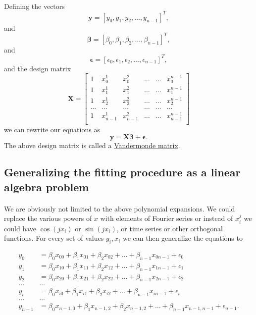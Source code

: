 \documentclass[%
oneside,                 %
final,                   %
10pt]{article}
\begin{document}
\paragraph{}
Defining the vectors
\[
\bm{y} = [y_0,y_1, y_2,\dots, y_{n-1}]^T,
\]
and
\[
\bm{\beta} = [\beta_0,\beta_1, \beta_2,\dots, \beta_{n-1}]^T,
\]
and
\[
\bm{\epsilon} = [\epsilon_0,\epsilon_1, \epsilon_2,\dots, \epsilon_{n-1}]^T,
\]
and the design matrix
\[
\bm{X}=
\begin{bmatrix} 
1& x_{0}^1 &x_{0}^2& \dots & \dots &x_{0}^{n-1}\\
1& x_{1}^1 &x_{1}^2& \dots & \dots &x_{1}^{n-1}\\
1& x_{2}^1 &x_{2}^2& \dots & \dots &x_{2}^{n-1}\\                      
\dots& \dots &\dots& \dots & \dots &\dots\\
1& x_{n-1}^1 &x_{n-1}^2& \dots & \dots &x_{n-1}^{n-1}\\
\end{bmatrix} 
\]
we can rewrite our equations as
\[
\bm{y} = \bm{X}\bm{\beta}+\bm{\epsilon}.
\]
The above design matrix is called a \href{{https://en.wikipedia.org/wiki/Vandermonde_matrix}}{Vandermonde matrix}.




\subsection{Generalizing the fitting procedure as a linear algebra problem}

\paragraph{}

We are obviously not limited to the above polynomial expansions.  We
could replace the various powers of $x$ with elements of Fourier
series or instead of $x_i^j$ we could have $\cos{(j x_i)}$ or $\sin{(j
x_i)}$, or time series or other orthogonal functions.  For every set
of values $y_i,x_i$ we can then generalize the equations to

\begin{align*}
y_0&=\beta_0x_{00}+\beta_1x_{01}+\beta_2x_{02}+\dots+\beta_{n-1}x_{0n-1}+\epsilon_0\\
y_1&=\beta_0x_{10}+\beta_1x_{11}+\beta_2x_{12}+\dots+\beta_{n-1}x_{1n-1}+\epsilon_1\\
y_2&=\beta_0x_{20}+\beta_1x_{21}+\beta_2x_{22}+\dots+\beta_{n-1}x_{2n-1}+\epsilon_2\\
\dots & \dots \\
y_{i}&=\beta_0x_{i0}+\beta_1x_{i1}+\beta_2x_{i2}+\dots+\beta_{n-1}x_{in-1}+\epsilon_i\\
\dots & \dots \\
y_{n-1}&=\beta_0x_{n-1,0}+\beta_1x_{n-1,2}+\beta_2x_{n-1,2}+\dots+\beta_{n-1}x_{n-1,n-1}+\epsilon_{n-1}.\\
\end{align*}
\end{document}
